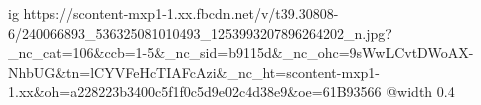  
 
 
 
 

\ifcmt
  ig https://scontent-mxp1-1.xx.fbcdn.net/v/t39.30808-6/240066893_536325081010493_1253993207896264202_n.jpg?_nc_cat=106&ccb=1-5&_nc_sid=b9115d&_nc_ohc=9sWwLCvtDWoAX-NhbUG&tn=lCYVFeHcTIAFcAzi&_nc_ht=scontent-mxp1-1.xx&oh=a228223b3400c5f1f0c5d9e02c4d38e9&oe=61B93566
  @width 0.4
\fi
